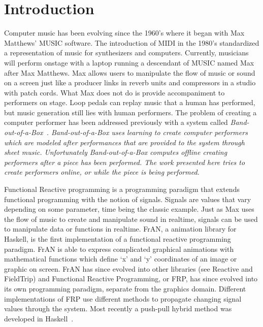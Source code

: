 \documentclass[12pt]{ucthesis}
\begin{document}
\pagestyle{plain}

\renewcommand{\baselinestretch}{1.66}


\chapter{Introduction}
\label{intro}

Computer music has been evolving since the 1960's where it began with Max Matthews' MUSIC software. The introduction of MIDI in the 1980's standardized a representation of music for synthesizers and computers. Currently, musicians will perform onstage with a laptop running a descendant of MUSIC named Max after Max Matthews. Max allows users to manipulate the flow of music or sound on a screen just like a producer links in reverb units and compressors in a studio with patch cords. What Max does not do is provide accompaniment to performers on stage. Loop pedals can replay music that a human has performed, but music generation still lies with human performers. The problem of creating a computer performer has been addressed previously with a system called \em{Band-out-of-a-Box}\em~\cite{bob}. \em{Band-out-of-a-Box }\em uses learning to create computer performers which are modeled after performances that are provided to the system through sheet music. Unfortunately \em{Band-out-of-a-Box }\em computes offline creating performers after a piece has been performed. The work presented here tries to create performers online, or while the piece is being performed.

Functional Reactive programming is a programming paradigm that extends functional programming with the notion of signals. Signals are values that vary depending on some parameter, time being the classic example. Just as Max uses the flow of music to create and manipulate sound in realtime, signals can be used to manipulate data or functions in realtime. FrAN, a animation library for Haskell, is the first implementation of a functional reactive programming paradigm. FrAN is able to express complicated graphical animations with mathematical functions which define `x' and `y' coordinates of an image or graphic on screen. FrAN has since evolved into other libraries (see Reactive and FieldTrip) and Functional Reactive Programming, or FRP, has since evolved into its own programming paradigm, separate from the graphics domain. Different implementations of FRP use different methods to propagate changing signal values through the system. Most recently a push-pull hybrid method was developed in Haskell~\cite{push-pull-frp}. 
\end{document}
